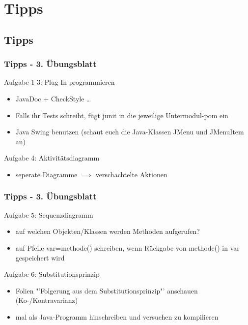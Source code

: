 \documentclass[18pt]{beamer}
\begin{document}

\section{Tipps}
	\subsection{Tipps}
	\begin{frame}
		\frametitle{Tipps - 3. Übungsblatt}
			\begin{exampleblock}{Aufgabe 1-3: Plug-In programmieren}
				\begin{itemize}
					\pause
					\item JavaDoc + CheckStyle \dots
					\item Falls ihr Tests schreibt, fügt junit in die jeweilige Untermodul-pom ein
					\item Java Swing benutzen (schaut euch die Java-Klassen JMenu und JMenuItem an)
				\end{itemize}
			\end{exampleblock}
			\pause
			\begin{exampleblock}{Aufgabe 4: Aktivitätsdiagramm}
				\begin{itemize}
					\pause 
					\item seperate Diagramme $\implies$ verschachtelte Aktionen
				\end{itemize}
			\end{exampleblock}
	\end{frame}

	\begin{frame}
		\frametitle{Tipps - 3. Übungsblatt}
			\begin{exampleblock}{Aufgabe 5: Sequenzdiagramm}
				\begin{itemize}
					\pause
					\item auf welchen Objekten/Klassen werden Methoden aufgerufen?
					\item auf Pfeile var=methode() schreiben, wenn Rückgabe von methode() in var gespeichert wird
				\end{itemize}
			\end{exampleblock}
			\pause
			\begin{exampleblock}{Aufgabe 6: Substitutionsprinzip}
				\begin{itemize}
					\pause
					\item Folien "'Folgerung aus dem Substitutionsprinzip"' anschauen (Ko-/Kontravarianz)
					\item mal als Java-Programm hinschreiben und versuchen zu kompilieren
				\end{itemize}
			\end{exampleblock}
	\end{frame}
	
\end{document}
